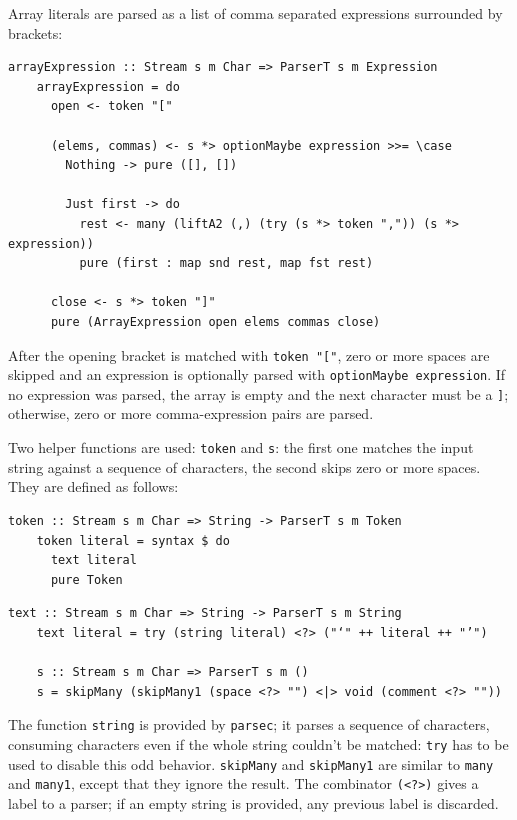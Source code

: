\documentclass[UdineBachThesis,american,11pt]{PhdThesis}
\begin{document}
  Array literals are parsed as a list of comma separated expressions surrounded
  by brackets:

  \begin{Verbatim}[gobble=4,fontsize=\small]
    arrayExpression :: Stream s m Char => ParserT s m Expression
    arrayExpression = do
      open <- token "["

      (elems, commas) <- s *> optionMaybe expression >>= \case
        Nothing -> pure ([], [])

        Just first -> do
          rest <- many (liftA2 (,) (try (s *> token ",")) (s *> expression))
          pure (first : map snd rest, map fst rest)

      close <- s *> token "]"
      pure (ArrayExpression open elems commas close)
  \end{Verbatim}

  After the opening bracket is matched with \mbox{\texttt{token "["}}, zero or
  more spaces are skipped and an expression is optionally parsed with
  \mbox{\texttt{optionMaybe expression}}. If no expression was parsed, the array
  is empty and the next character must be a \texttt{]}; otherwise, zero or more
  comma-expression pairs are parsed.

  Two helper functions are used: \mbox{\texttt{token}} and \texttt{s}: the first
  one matches the input string against a sequence of characters, the second
  skips zero or more spaces. They are defined as follows:

  \begin{Verbatim}[gobble=4,fontsize=\small]
    token :: Stream s m Char => String -> ParserT s m Token
    token literal = syntax $ do
      text literal
      pure Token
  \end{Verbatim}

  \pagebreak

  \begin{Verbatim}[gobble=4,fontsize=\small]
    text :: Stream s m Char => String -> ParserT s m String
    text literal = try (string literal) <?> ("‘" ++ literal ++ "’")

    s :: Stream s m Char => ParserT s m ()
    s = skipMany (skipMany1 (space <?> "") <|> void (comment <?> ""))
  \end{Verbatim}

  The function \mbox{\texttt{string}} is provided by \mbox{\texttt{parsec}}; it
  parses a sequence of characters, consuming characters even if the whole string
  couldn't be matched: \mbox{\texttt{try}} has to be used to disable this odd
  behavior. \mbox{\texttt{skipMany}} and \mbox{\texttt{skipMany1}} are similar
  to \mbox{\texttt{many}} and \mbox{\texttt{many1}}, except that they ignore the
  result. The combinator \mbox{\texttt{(<?>)}} gives a label to a parser; if an
  empty string is provided, any previous label is discarded.
\end{document}
